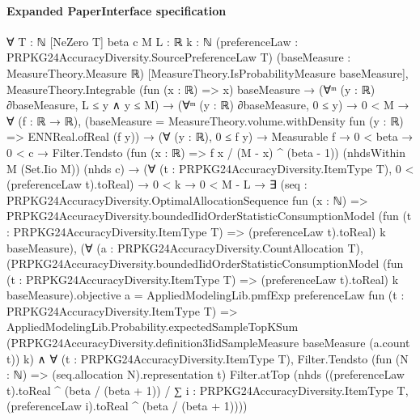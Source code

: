 \documentclass[10pt]{article}
\begin{document}
\paragraph{Expanded PaperInterface specification}
\begin{ReviewVerbatim}
∀ {T : ℕ} [NeZero T] {beta c M L : ℝ} {k : ℕ} (preferenceLaw : PRPKG24AccuracyDiversity.SourcePreferenceLaw T)
  (baseMeasure : MeasureTheory.Measure ℝ) [MeasureTheory.IsProbabilityMeasure baseMeasure],
  MeasureTheory.Integrable (fun (x : ℝ) => x) baseMeasure →
    (∀ᵐ (y : ℝ) ∂baseMeasure, L ≤ y ∧ y ≤ M) →
      (∀ᵐ (y : ℝ) ∂baseMeasure, 0 ≤ y) →
        0 < M →
          ∀ (f : ℝ → ℝ),
            (baseMeasure = MeasureTheory.volume.withDensity fun (y : ℝ) => ENNReal.ofReal (f y)) →
              (∀ (y : ℝ), 0 ≤ f y) →
                Measurable f →
                  0 < beta →
                    0 < c →
                      Filter.Tendsto (fun (x : ℝ) => f x / (M - x) ^ (beta - 1)) (nhdsWithin M (Set.Iio M)) (nhds c) →
                        (∀ (t : PRPKG24AccuracyDiversity.ItemType T), 0 < (preferenceLaw t).toReal) →
                          0 < k →
                            0 < M - L →
                              ∃ (seq :
                                PRPKG24AccuracyDiversity.OptimalAllocationSequence fun (x : ℕ) =>
                                  PRPKG24AccuracyDiversity.boundedIidOrderStatisticConsumptionModel
                                    (fun (t : PRPKG24AccuracyDiversity.ItemType T) => (preferenceLaw t).toReal) k
                                    baseMeasure),
                                (∀ (a : PRPKG24AccuracyDiversity.CountAllocation T),
                                    (PRPKG24AccuracyDiversity.boundedIidOrderStatisticConsumptionModel
                                            (fun (t : PRPKG24AccuracyDiversity.ItemType T) => (preferenceLaw t).toReal)
                                            k baseMeasure).objective
                                        a =
                                      AppliedModelingLib.pmfExp preferenceLaw
                                        fun (t : PRPKG24AccuracyDiversity.ItemType T) =>
                                        AppliedModelingLib.Probability.expectedSampleTopKSum
                                          (PRPKG24AccuracyDiversity.definition3IidSampleMeasure baseMeasure (a.count t))
                                          k) ∧
                                  ∀ (t : PRPKG24AccuracyDiversity.ItemType T),
                                    Filter.Tendsto (fun (N : ℕ) => (seq.allocation N).representation t) Filter.atTop
                                      (nhds
                                        ((preferenceLaw t).toReal ^ (beta / (beta + 1)) /
                                          ∑ i : PRPKG24AccuracyDiversity.ItemType T,
                                            (preferenceLaw i).toReal ^ (beta / (beta + 1))))
\end{ReviewVerbatim}
\end{document}
